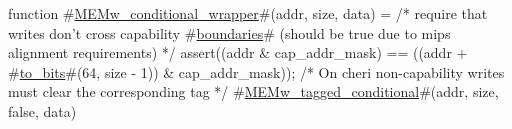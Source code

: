 function #\hyperref[sailMIPSzMEMwzyconditionalzywrapper]{MEMw\_conditional\_wrapper}#(addr, size, data) =
  {
    /* require that writes don't cross capability #\hyperref[sailMIPSzboundaries]{boundaries}# (should be true due to mips alignment requirements) */
    assert((addr & cap_addr_mask) == ((addr + #\hyperref[sailMIPSztozybits]{to\_bits}#(64, size - 1)) & cap_addr_mask));
    /* On cheri non-capability writes must clear the corresponding tag */
    #\hyperref[sailMIPSzMEMwzytaggedzyconditional]{MEMw\_tagged\_conditional}#(addr, size, false, data)
  }
